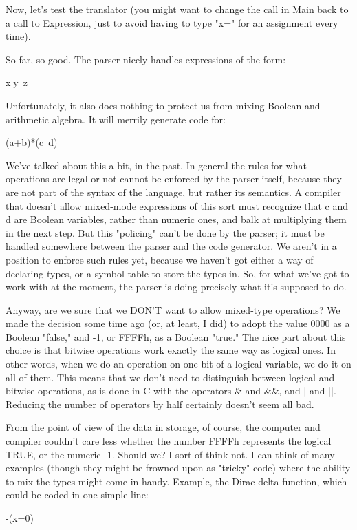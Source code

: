 \documentclass[float=false, crop=false]{standalone}
\begin{document}
Now, let's test the translator (you might want to change the call in Main back
to a call to Expression, just to avoid having to type "x=" for an assignment
every time).

So far, so good. The parser nicely handles expressions of the form:

	x|y~z

Unfortunately, it also does nothing to protect us from mixing Boolean and
arithmetic algebra. It will merrily generate code for:

	(a+b)*(c~d)

We've talked about this a bit, in the past. In general the rules for what
operations are legal or not cannot be enforced by the parser itself, because
they are not part of the syntax of the language, but rather its semantics. A
compiler that doesn't allow mixed-mode expressions of this sort must recognize
that c and d are Boolean variables, rather than numeric ones, and balk at
multiplying them in the next step. But this "policing" can't be done by the
parser; it must be handled somewhere between the parser and the code generator.
We aren't in a position to enforce such rules yet, because we haven't got either
a way of declaring types, or a symbol table to store the types in. So, for what
we've got to work with at the moment, the parser is doing precisely what it's
supposed to do.

Anyway, are we sure that we DON'T want to allow mixed-type operations? We made
the decision some time ago (or, at least, I did) to adopt the value 0000 as a
Boolean "false," and -1, or FFFFh, as a Boolean "true." The nice part about this
choice is that bitwise operations work exactly the same way as logical ones. In
other words, when we do an operation on one bit of a logical variable, we do it
on all of them. This means that we don't need to distinguish between logical and
bitwise operations, as is done in C with the operators \& and \&\&, and | and ||.
Reducing the number of operators by half certainly doesn't seem all bad.

From the point of view of the data in storage, of course, the computer and
compiler couldn't care less whether the number FFFFh represents the logical
TRUE, or the numeric -1. Should we? I sort of think not. I can think of many
examples (though they might be frowned upon as "tricky" code) where the ability
to mix the types might come in handy. Example, the Dirac delta function, which
could be coded in one simple line:

	-(x=0)
\end{document}
